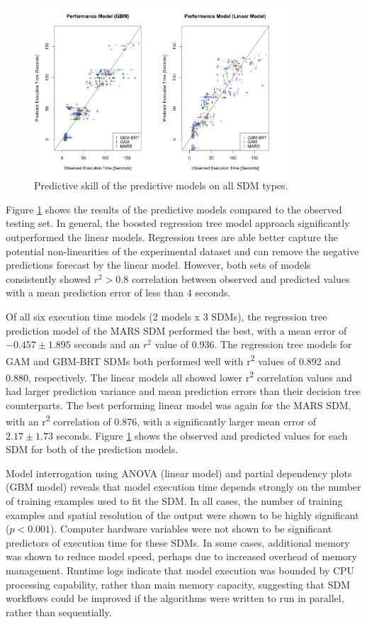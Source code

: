 \documentclass[a4paper]{article}
\begin{document}
\begin{figure}
\centering
\includegraphics[width=0.85\textwidth]{CI_plot-I.png}
\caption{Predictive skill of the predictive models on all SDM types.}\label{fig:all_models}
\end{figure}

Figure \ref{fig:all_models} shows the results of the predictive models compared to the observed testing set. In general, the boosted regression tree model approach significantly outperformed the linear models. Regression trees are able better capture the potential non-linearities of the experimental dataset and can remove the negative predictions forecast by the linear model. However, both sets of models consistently showed $r^2 > 0.8$ correlation between observed and predicted values with a mean prediction error of less than 4 seconds.  

Of all six execution time models (2 models x 3 SDMs), the regression tree prediction model of the MARS SDM performed the best, with a mean error of $-0.457 \pm 1.895$ seconds and an $r^2$ value of 0.936. The regression tree models for GAM and GBM-BRT SDMs both performed well with r\textsuperscript{2} values of 0.892 and 0.880, respectively. The linear models all showed lower r\textsuperscript{2} correlation values and had larger prediction variance and mean prediction errors than their decision tree counterparts.  The best performing linear model was again for the MARS SDM, with an r\textsuperscript{2} correlation of 0.876, with a significantly larger mean error of $2.17 \pm 1.73$ seconds. Figure \ref{fig:all_models} shows the observed and predicted values for each SDM for both of the prediction models.

Model interrogation using ANOVA (linear model) and partial dependency plots (GBM model) reveals that model execution time depends strongly on the number of training examples used to fit the SDM. In all cases, the number of training examples and spatial resolution of the output were shown to be highly significant ($p < 0.001$). Computer hardware variables were not shown to be significant predictors of execution time for these SDMs.  In some cases, additional memory was shown to reduce model speed, perhaps due to increased overhead of memory management. Runtime logs indicate that model execution was bounded by CPU processing capability, rather than main memory capacity, suggesting that SDM workflows could be improved if the algorithms were written to run in parallel, rather than sequentially.
\end{document}
